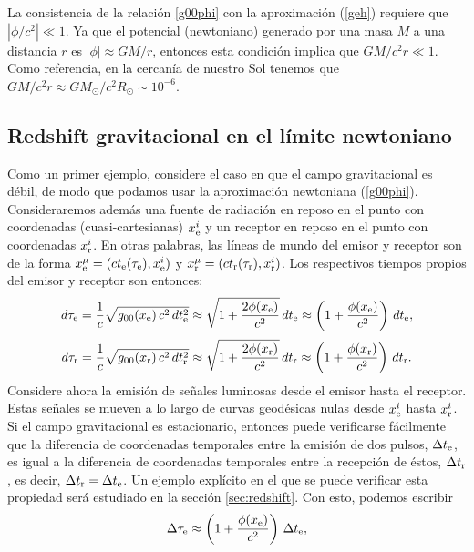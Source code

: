 La consistencia de la relación \eqref{g00phi} con la aproximación (\ref{geh}) requiere que $|{\phi}/{c^2}|\ll 1$. Ya que el potencial (newtoniano) generado por una masa $M$ a una distancia $r$ es $|\phi|\approx {GM}/{r}$, entonces esta condición implica que ${GM}/{c^2r}\ll 1$. Como referencia, en la cercanía de nuestro Sol tenemos que ${GM}/{c^2r}\approx {GM_\odot}{/c^2R_\odot}\sim 10^{-6}$.


\subsection{Redshift gravitacional en el límite newtoniano}\label{zg1}

Como un primer ejemplo, considere el caso en que el campo gravitacional es débil, de modo que podamos usar la aproximación newtoniana (\ref{g00phi}). Consideraremos además una fuente de radiación en reposo en el punto con coordenadas (cuasi-cartesianas) $x^i_{\rm e}$ y un receptor en reposo en el punto con coordenadas $x^i_{\rm r}$. En otras palabras, las líneas de mundo del emisor y receptor son de la forma $x^\mu_{\rm e}=(ct_{\rm e}(\tau_{\rm e}),x^i_{\rm e})$ y $x^\mu_{\rm r}=(ct_{\rm r}(\tau_{\rm r}),x^i_{\rm r})$. Los respectivos tiempos propios del emisor y receptor son entonces:
\begin{equation}
 d\tau_{\rm e}=\frac{1}{c}\sqrt{g_{00}(x_{\rm e})\,c^2\,dt^2_{\rm e}}\approx \sqrt{1+\frac{2\phi(x_{\rm e})}{c^2}}\,dt_{\rm e}\approx \left(1+\frac{\phi(x_{\rm e})}{c^2}\right)\,dt_{\rm e},
\end{equation}
\begin{equation}
 d\tau_{\rm r}=\frac{1}{c}\sqrt{g_{00}(x_{\rm r})\,c^2\,dt^2_{\rm r}}\approx \sqrt{1+\frac{2\phi(x_{\rm r})}{c^2}}\,dt_{\rm r}\approx \left(1+\frac{\phi(x_{\rm r})}{c^2}\right)\,dt_{\rm r}.
\end{equation}
Considere ahora la emisión de señales luminosas desde el emisor hasta el receptor. Estas señales se mueven a lo largo de curvas geodésicas nulas desde $x^i_{\rm e}$ hasta $x^i_{\rm r}$. Si el campo gravitacional es estacionario, entonces puede verificarse fácilmente que la diferencia de coordenadas temporales entre la emisión de dos pulsos, $ \Delta t_{\rm e}$, es igual a la diferencia de coordenadas temporales entre la recepción de éstos, $ \Delta t_{\rm r}$, es decir, $ \Delta t_{\rm r}= \Delta t_{\rm e}$. Un ejemplo explícito en el que se puede verificar esta propiedad será estudiado en la sección \ref{sec:redshift}. Con esto, podemos escribir
\begin{equation}
 \Delta\tau_{\rm e}\approx \left(1+\frac{\phi(x_{\rm e})}{c^2}\right)\, \Delta t_{\rm e},
\end{equation}
